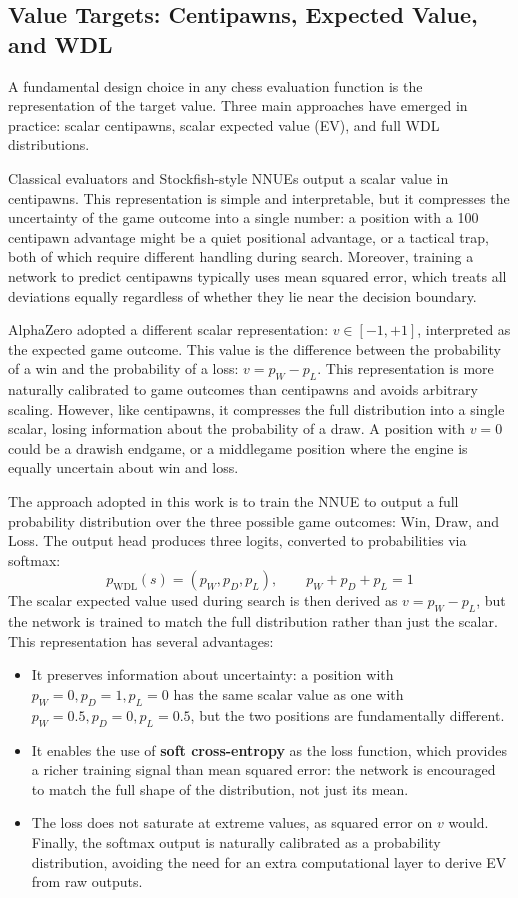 
\subsection{Value Targets: Centipawns, Expected Value, and WDL}
A fundamental design choice in any chess evaluation function is the representation of the target value. Three main approaches have emerged in practice: scalar centipawns, scalar expected value (EV), and full WDL distributions.

Classical evaluators and Stockfish-style NNUEs output a scalar value in centipawns. This representation is simple and interpretable, but it compresses the uncertainty of the game outcome into a single number: a position with a 100 centipawn advantage might be a quiet positional advantage, or a tactical trap, both of which require different handling during search. Moreover, training a network to predict centipawns typically uses mean squared error, which treats all deviations equally regardless of whether they lie near the decision boundary.

AlphaZero adopted a different scalar representation: $v \in [-1, +1]$, interpreted as the expected game outcome. This value is the difference between the probability of a win and the probability of a loss: $v = p_W - p_L$. This representation is more naturally calibrated to game outcomes than centipawns and avoids arbitrary scaling. However, like centipawns, it compresses the full distribution into a single scalar, losing information about the probability of a draw. A position with $v = 0$ could be a drawish endgame, or a middlegame position where the engine is equally uncertain about win and loss.

The approach adopted in this work is to train the NNUE to output a full probability distribution over the three possible game outcomes: Win, Draw, and Loss. The output head produces three logits, converted to probabilities via softmax:
\[
p_{\text{WDL}}(s) = (p_W, p_D, p_L), \qquad p_W + p_D + p_L = 1
\]
The scalar expected value used during search is then derived as $v = p_W - p_L$, but the network is trained to match the full distribution rather than just the scalar. This representation has several advantages:
\begin{itemize}
	\item It preserves information about uncertainty: a position with $p_W = 0, p_D = 1, p_L = 0$ has the same scalar value as one with $p_W = 0.5, p_D = 0, p_L = 0.5$, but the two positions are fundamentally different.
	\item It enables the use of \textbf{soft cross-entropy} as the loss function, which provides a richer training signal than mean squared error: the network is encouraged to match the full shape of the distribution, not just its mean.
	\item The loss does not saturate at extreme values, as squared error on $v$ would. Finally, the softmax output is naturally calibrated as a probability distribution, avoiding the need for an extra computational layer to derive EV from raw outputs.
\end{itemize}

